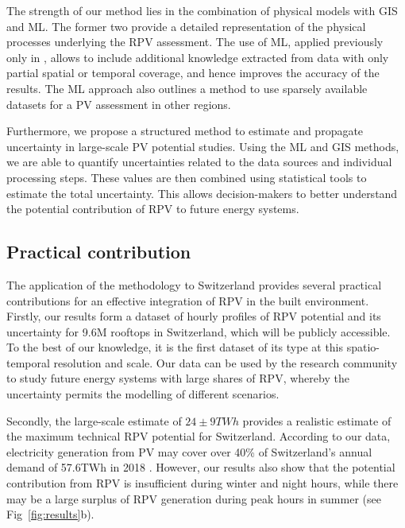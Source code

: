 The strength of our method lies in the combination of physical models with GIS and ML. The former two provide a detailed representation of the physical processes underlying the RPV assessment. The use of ML, applied previously only in \cite{assouline_quantifying_2017, assouline_large-scale_2018}, allows to include additional knowledge extracted from data with only partial spatial or temporal coverage, and hence improves the accuracy of the results. 
The ML approach also outlines a method to use sparsely available datasets for a PV assessment in other regions.

Furthermore, we propose a structured method to estimate and propagate uncertainty in large-scale PV potential studies. Using the ML and GIS methods, we are able to quantify uncertainties related to the data sources and individual processing steps. These values are then combined using statistical tools to estimate the total uncertainty.
This allows decision-makers to better understand the potential contribution of RPV to future energy systems. 


\subsection{Practical contribution}

The application of the methodology to Switzerland provides several practical contributions for an effective integration of RPV in the built environment. 
Firstly, our results form a dataset of hourly profiles of RPV potential and its uncertainty for 9.6M rooftops in Switzerland, which will be publicly accessible. To the best of our knowledge, it is the first dataset of its type at this spatio-temporal resolution and scale. Our data can be used by the research community to study future energy systems with large shares of RPV, whereby the uncertainty permits the modelling of different scenarios. 

Secondly, the large-scale estimate of $24 \pm 9 TWh$ provides a realistic estimate of the maximum technical RPV potential for Switzerland. According to our data, electricity generation from PV may cover over 40\% of Switzerland's annual demand of 57.6TWh in 2018 \cite{swiss_federal_institue_for_energy_schweizerische_2018}. However, our results also show that the potential contribution from RPV is insufficient during winter and night hours, while there may be a large surplus of RPV generation during peak hours in summer (see Fig~\ref{fig:results}b).

